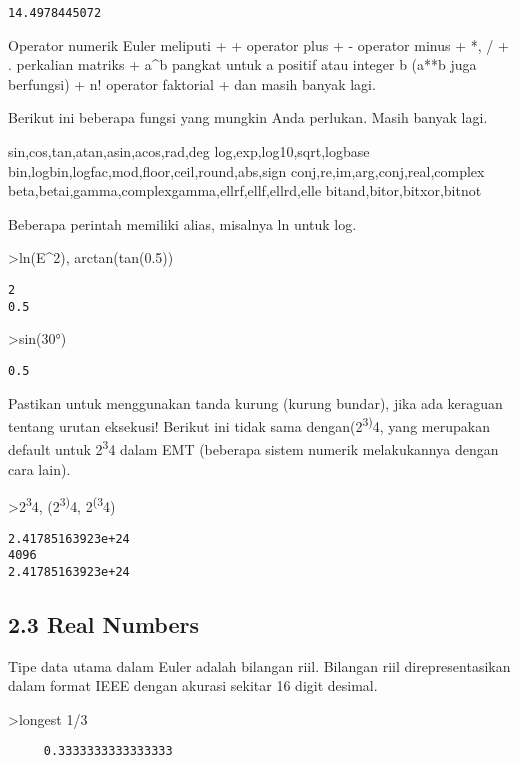 \documentclass[
]{book}
\begin{document}
\begin{verbatim}
14.4978445072
\end{verbatim}

Operator numerik Euler meliputi + + operator plus + - operator minus + *, / + . perkalian matriks + a\^{}b pangkat untuk a positif atau integer b (a**b juga berfungsi) + n! operator faktorial + dan masih banyak lagi.

Berikut ini beberapa fungsi yang mungkin Anda perlukan. Masih banyak lagi.

sin,cos,tan,atan,asin,acos,rad,deg log,exp,log10,sqrt,logbase bin,logbin,logfac,mod,floor,ceil,round,abs,sign conj,re,im,arg,conj,real,complex beta,betai,gamma,complexgamma,ellrf,ellf,ellrd,elle bitand,bitor,bitxor,bitnot

Beberapa perintah memiliki alias, misalnya ln untuk log.

\textgreater ln(E\^{}2), arctan(tan(0.5))

\begin{verbatim}
2
0.5
\end{verbatim}

\textgreater sin(30°)

\begin{verbatim}
0.5
\end{verbatim}

Pastikan untuk menggunakan tanda kurung (kurung bundar), jika ada keraguan tentang urutan eksekusi! Berikut ini tidak sama dengan(2\textsuperscript{3)}4, yang merupakan default untuk 2\textsuperscript{3}4 dalam EMT (beberapa sistem numerik melakukannya dengan cara lain).

\textgreater2\textsuperscript{3}4, (2\textsuperscript{3)}4, 2\textsuperscript{(3}4)

\begin{verbatim}
2.41785163923e+24
4096
2.41785163923e+24
\end{verbatim}

\subsection{2.3 Real Numbers}\label{real-numbers}

Tipe data utama dalam Euler adalah bilangan riil. Bilangan riil direpresentasikan dalam format IEEE dengan akurasi sekitar 16 digit desimal.

\textgreater longest 1/3

\begin{verbatim}
     0.3333333333333333 
\end{verbatim}
\end{document}
